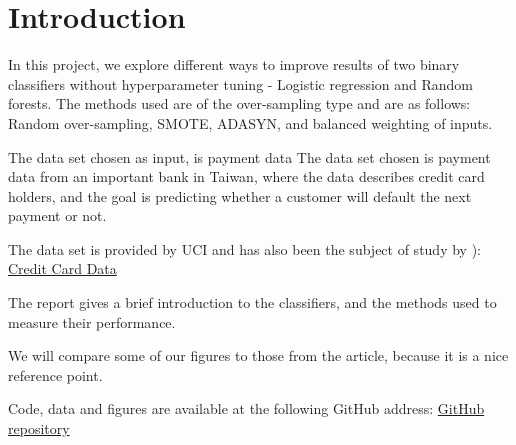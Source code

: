 \section{Introduction}
In this project, we explore different ways to improve results of two binary
classifiers without hyperparameter tuning - Logistic regression and
Random forests. The methods used are of the over-sampling type and are as
follows: Random over-sampling, SMOTE, ADASYN, and balanced weighting of
inputs.

The data set chosen as input, is payment data The data set chosen is payment
data from an important bank in Taiwan, where the data describes credit card 
holders, and the goal is predicting whether a customer will default the 
next payment or not.

The data set is provided by UCI and has also been the subject of study by \cite{ComparisonData}): 
\href{https://archive.ics.uci.edu/ml/datasets/default+of+credit+card+clients}{Credit Card Data}

The report gives a brief introduction to the classifiers, and the methods
used to measure their performance.

We will compare some of our figures to those from the article, because it is
a nice reference point. 

Code, data and figures are available at the following GitHub address:
\href{https://github.com/geirtul/fys-stk4155/tree/master/project3}{GitHub repository}


